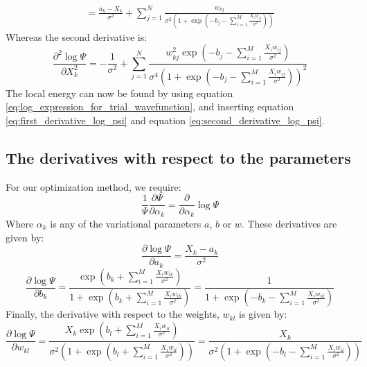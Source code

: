 \documentclass[a4paper, 10pt]{article}
\begin{document}
\begin{appendices}
\begin{equation}
\begin{split}
	=\frac{a_k-X_k}{\sigma^2}+\sum_{j=1}^N \frac{w_{kj}}{\sigma^2 \left(1+ \exp \left(-b_j-\sum_{i=1}^{M} \frac{X_iw_{ij}}{\sigma^2}\right)\right)}
	\end{split}
	\end{equation}
	Whereas the second derivative is:
	\begin{equation}\label{eq:second_derivative_log_psi}
	\frac{\partial^2 \log \Psi}{\partial X_k^2}=-\frac{1}{\sigma^2}+\sum_{j=1}^N \frac{w_{kj}^2 \exp \left(-b_j-\sum_{i=1}^{M}\frac{X_iw_{ij}}{\sigma^2} \right)}{\sigma^4\left(1+ \exp \left(-b_j-\sum_{i=1}^{M} \frac{X_iw_{ij}}{\sigma^2}\right)\right)^2}
	\end{equation}
	The local energy can now be found by using equation \ref{eq:log_expression_for_trial_wavefunction}, and inserting equation \ref{eq:first_derivative_log_psi} and equation \ref{eq:second_derivative_log_psi}.
	\subsection{The derivatives with respect to the parameters}
	For our optimization method, we require:
	\begin{equation}
	\frac{1}{\Psi}\frac{\partial \Psi}{\partial \alpha_k}=\frac{\partial }{\partial \alpha_k}\log \Psi
	\end{equation}
	Where $\alpha_k$ is any of the variational parameters $a$, $b$ or $w$. These derivatives are given by:
	\begin{equation}
	\frac{\partial \log \Psi }{\partial a_k}=\frac{X_k-a_k}{\sigma^2}
	\end{equation}
	\begin{equation}
	\frac{\partial \log \Psi}{\partial b_k}=\frac{\exp \left(b_k+\sum_{i=1}^M \frac{X_iw_{ik}}{\sigma^2}\right)}{1+\exp \left(b_k+\sum_{i=1}^M \frac{X_iw_{ik}}{\sigma^2}\right)}=\frac{1}{1+\exp \left(-b_k-\sum_{i=1}^M \frac{X_i w_{ik}}{\sigma^2}\right)}
	\end{equation}
	Finally, the derivative with respect to the weights, $w_{kl}$ is given by:
	\begin{equation}
	\frac{\partial \log \Psi}{\partial w_{kl}}=\frac{X_k\exp\left(b_l+\sum_{i=1}^M \frac{X_iw_{il}}{\sigma^2}\right)}{\sigma^2\left(1+\exp \left( b_l + \sum_{i=1}^M \frac{X_iw_{il}}{\sigma^2}\right)\right)}=\frac{X_k}{\sigma^2\left(1+\exp \left(-b_l-\sum_{i=1}^M \frac{X_iw_{il}}{\sigma^2}\right)\right)}
	\end{equation}

\end{appendices}
\end{document}
